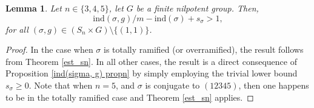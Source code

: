 \documentclass[11pt]{amsart}
\newtheorem{Lemma}[theorem]{Lemma}
\newtheorem{remark}[theorem]{Remark}
\newcommand{\ind}{\mathrm{ind}}
\numberwithin{equation}{section}
\begin{document}
\begin{Lemma}\label{main Lemma}
    Let $n \in \{3, 4, 5\}$, let $G$ be a finite nilpotent group. Then,
\[
\ind(\sigma, g)/m - \ind(\sigma) + s_{\sigma} > 1,
\]
for all $(\sigma, g) \in (S_n\times G)\setminus \{(1, 1)\}$.
\end{Lemma}
\begin{proof}
    In the case when $\sigma$ is totally ramified (or overramified), the result follows from Theorem \ref{est_sn}. In all other cases, the result is a direct consequence of Proposition \ref{ind(sigma, g) propn} by simply employing the trivial lower bound $s_\sigma\geq 0$. Note that when $n=5$, and $\sigma$ is conjugate to $(12345)$, then one happens to be in the totally ramified case and Theorem \ref{est_sn} applies.
\end{proof}
\end{document}

